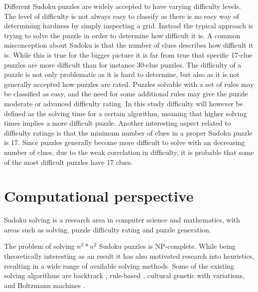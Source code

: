 \documentclass[a4paper,11pt]{kth-mag}
\begin{document}
Different Sudoku puzzles are widely accepted to have varying difficulty levels.
The level of difficulty is not always easy to classify as there is no easy way of determining hardness by simply inspecting a grid.
Instead the typical approach is trying to solve the puzzle in order to determine how difficult it is.
A common misconception about Sudoku is that the number of clues describes how difficult it is.
While this is true for the bigger picture it is far from true that specific 17-clue puzzles are more difficult than for instance 30-clue puzzles.\cite{sudokuDifficulty}
The difficulty of a puzzle is not only problematic as it is hard to determine, but also as it is not generally accepted how puzzles are rated.
Puzzles solvable with a set of rules may be classified as easy, and the need for some additional rules may give the puzzle moderate or advanced difficulty rating.
In this study difficulty will however be defined as the solving time for a certain algorithm, meaning that higher solving times implies a more difficult puzzle.
Another interesting aspect related to difficulty ratings is that the minimum number of clues in a proper Sudoku puzzle is 17.\cite{17clueProof} 
Since puzzles generally become more difficult to solve with an decreasing number of clues, due to the weak correlation in difficulty, it is probable that some of the most difficult puzzles have 17 clues. 

\FloatBarrier
\section{Computational perspective}
Sudoku solving is a research area in computer science and mathematics, with areas such as solving, puzzle difficulty rating and puzzle generation.\cite{stochastic, sudokuConstruct, generation}

The problem of solving $n^2 * n^2$ Sudoku puzzles is NP-complete.\cite{complexity}
While being theoretically interesting as an result it has also motivated research into heuristics, resulting in a wide range of available solving methods.
Some of the existing solving algorithms are backtrack \cite{searchBased}, rule-based \cite{techniques}, cultural genetic with variations\cite{stochastic}, and Boltzmann machines \cite{boltzmann}.
\end{document}
